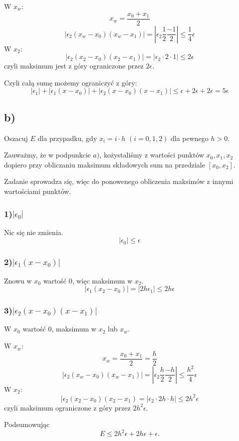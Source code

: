 \documentclass{article}
\begin{document}
W $x_w$:
$$x_w = \frac{x_0 + x_1}{2}$$
$$|\epsilon_2(x_w-x_0)(x_w-x_1)| = \left|\epsilon_2\frac{1}{2}\frac{-1}{2}\right| \le \frac{1}{4}\epsilon$$
W $x_2$:
$$|\epsilon_2(x_2-x_0)(x_2-x_1)| = |\epsilon_2\cdot2\cdot1| \le 2\epsilon$$
czyli maksimum jest z góry ograniczone przez $2\epsilon$.


Czyli całą sumę możemy ograniczyć z góry:
$$|\epsilon_1| + |\epsilon_1(x-x_0)| + |\epsilon_2(x-x_0)(x-x_1)| \le \epsilon + 2\epsilon + 2\epsilon = 5\epsilon  $$

\newpage

\subsection*{b)}
Oszacuj $E$ dla przypadku, gdy $x_i=i⋅h$ $(i=0,1,2)$ dla pewnego $h>0$.

Zauważmy, że w podpunkcie $a)$, kożystaliśmy z wartości punktów $x_0, x_1, x_2$ dopiero przy obliczaniu maksimum składowych sum na przedziale $[x_0, x_2]$.

Zadanie sprowadza się, więc do ponowenego obliczenia maksimów z innymi wartościami punktów.

\subsubsection*{1)$|\epsilon_0|$}
Nic się nie zmienia.
$$|\epsilon_0| \le \epsilon$$

\subsubsection*{2)$|\epsilon_1(x-x_0)|$}
Znowu w $x_0$ wartość $0$, więc maksimum w $x_2$.
$$|\epsilon_1(x_2-x_0)| = |2h\epsilon_1| \le 2h\epsilon$$

\subsubsection*{3)$|\epsilon_2(x-x_0)(x-x_1)|$}
W $x_0$ wartość 0, maksimum w $x_2$ lub $x_w$.

W $x_w$:
$$ x_w = \frac{x_0+x_1}{2} = \frac{h}{2}$$
$$|\epsilon_2(x_w-x_0)(x_w-x_1)| = \left| \epsilon_2\frac{h}{2}\frac{-h}{2} \right| \le \frac{h^2}{4}\epsilon$$
W $x_2$:
$$|\epsilon_2(x_2-x_0)(x_2-x_1) = |\epsilon_2\cdot2h\cdot h| \le 2h^2\epsilon$$
czyli maksimum ograniczone z góry przez $2h^2\epsilon$.

Podsumowując $$E \le 2h^2\epsilon + 2h\epsilon + \epsilon.$$
\end{document}
